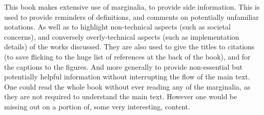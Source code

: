 \documentclass[12pt,parskip]{komatufte}
\begin{document}
This book makes extensive use of marginalia, to provide side information.
This is used to provide reminders of definitions, and comments on potentially unfamiliar notations.
As well as to highlight non-technical aspects (such as societal concerns), and conversely overly-technical aspects (such as implementation details) of the works discussed.
They are also used to give the titles to citations (to save flicking to the huge list of references at the back of the book), and for the captions to the figures.
And more generally to provide non-essential  but potentially helpful information without interrupting the flow of the main text.
One could read the whole book without ever reading any of the marginalia, as they are not required to understand the main text.
However one would be missing out on a portion of, some very interesting, content.
\end{document}
